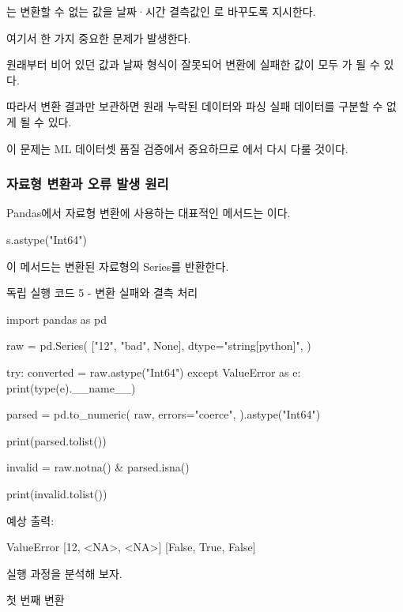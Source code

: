는 변환할 수 없는 값을 날짜·시간 결측값인 로 바꾸도록 지시한다.

여기서 한 가지 중요한 문제가 발생한다.

원래부터 비어 있던 값과 날짜 형식이 잘못되어 변환에 실패한 값이 모두 가 될 수 있다.

따라서 변환 결과만 보관하면 원래 누락된 데이터와 파싱 실패 데이터를 구분할 수 없게 될 수 있다.

이 문제는 ML 데이터셋 품질 검증에서 중요하므로 에서 다시 다룰 것이다.

\subsubsection{자료형 변환과 오류 발생 원리}

Pandas에서 자료형 변환에 사용하는 대표적인 메서드는 이다.

\begin{dhkcode}
s.astype("Int64")
\end{dhkcode}

이 메서드는 변환된 자료형의 Series를 반환한다.

\begin{dhknote}
\begin{dhksmry}[centered]
독립 실행 코드 5 - 변환 실패와 결측 처리
\end{dhksmry}
\end{dhknote}

\begin{dhkcode}
import pandas as pd

raw = pd.Series(
    ["12", "bad", None],
    dtype="string[python]",
)

try:
    converted = raw.astype("Int64")
except ValueError as e:
    print(type(e).__name__)

parsed = pd.to_numeric(
    raw,
    errors="coerce",
).astype("Int64")

print(parsed.tolist())

invalid = raw.notna() & parsed.isna()

print(invalid.tolist())
\end{dhkcode}

예상 출력:

\begin{dhkzsh}
ValueError
[12, <NA>, <NA>]
[False, True, False]
\end{dhkzsh}

실행 과정을 분석해 보자.

\begin{dhknote}
\begin{dhksmry}[centered]
첫 번째 변환
\end{dhksmry}
\end{dhknote}

